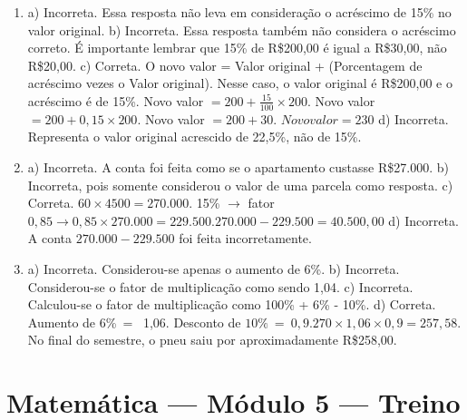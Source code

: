 \begin{enumerate}
\item a) Incorreta. Essa resposta não leva em consideração o acréscimo de 15\% no valor original.
b) Incorreta. Essa resposta também não considera o acréscimo correto. É importante lembrar que 15\% de R\$200,00 é igual a R\$30,00, não R\$20,00.
c) Correta. O novo valor = Valor original + (Porcentagem de acréscimo vezes o Valor original). Nesse caso, o valor original é
R\$200,00 e o acréscimo é de 15\%. Novo valor $= 200 + \frac {15}{100}\times 200.$ Novo valor $= 200 +
0,15 \times 200$. Novo valor $= 200 + 30$. $Novo valor = 230$
d) Incorreta. Representa o valor original acrescido de 22,5\%, não de 15\%.

\item a) Incorreta. A conta foi feita como se o apartamento custasse R\$27.000.
b) Incorreta, pois somente considerou o valor de uma parcela como
resposta.
c) Correta. $60 \times 4500 = 270.000$. 15\% $\rightarrow$ fator $0,85 \rightarrow 0,85 \times 270.000 = 229.500. 270.000 - 229.500 = 40.500,00$
d) Incorreta. A conta $270.000 - 229.500$ foi feita
incorretamente.

\item a) Incorreta. Considerou-se apenas o aumento de 6\%.
b) Incorreta. Considerou-se o fator de multiplicação como sendo 1,04.
c) Incorreta. Calculou-se o fator de multiplicação como 100\% + 6\% - 10\%.
d) Correta. Aumento de 6\%\  = \ 1,06. Desconto de $10\%\  = \ 0,9. 270 \times 1,06 \times 0,9 = 257,58$. No final do semestre, o pneu saiu por aproximadamente R\$258,00.
\end{enumerate}

\section*{Matemática — Módulo 5 — Treino}

